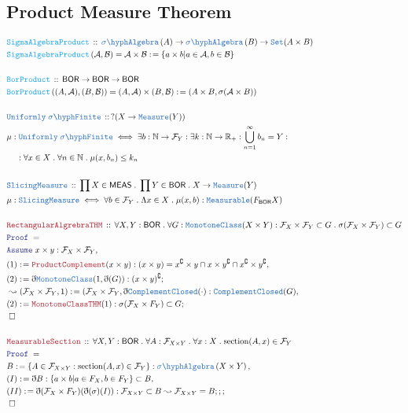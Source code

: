 \documentclass[12pt]{scrartcl}
\newcommand{\TYPE}[1]{\textcolor{NavyBlue}{\mathtt{#1}}}
\newcommand{\FUNC}[1]{\textcolor{Cerulean}{\mathtt{#1}}}
\newcommand{\LOGIC}[1]{\textcolor{Blue}{\mathtt{#1}}}
\newcommand{\THM}[1]{\textcolor{Maroon}{\mathtt{#1}}}
\renewcommand{\.}{\; . \;}
\newcommand{\de}{: \kern 0.1pc =}
\newcommand{\Act}[1]{\left( #1 \right)}
\newcommand{\Theorem}[2]{& \THM{#1} \, :: \, #2 \\ & \Proof = \\ }
\newcommand{\DeclareType}[2]{& \TYPE{#1} \, :: \, #2 \\}
\newcommand{\DefineType}[3]{& #1 : \TYPE{#2} \iff #3 \\}
\newcommand{\DeclareFunc}[2]{& \FUNC{#1} \, :: \, #2 \\}
\newcommand{\DefineNamedFunc}[4]{&  \FUNC{#1}\Act{#2} = #3 \de #4 \\}
\newcommand{\NewLine}{\\ & \kern 1pc}
\newcommand{\ForEach}[3]{\forall #1 : #2 \. #3 }
\newcommand{\Reals}{\mathbb{R} }
\newcommand{\Nat}{\mathbb{N} }
\newcommand{\Set}{\TYPE{Set}}
\renewcommand{\c}{\complement}
\newcommand{\Say}[3]{& #1 \de #2 : #3, \\}
\newcommand{\Conclude}[3]{& #1 \de #2 : #3; \\}
\newcommand{\Derive}[3]{& \leadsto #1 \de #2 : #3, \\}
\newcommand{\A}{\LOGIC{Assume} \;}
\newcommand{\Assume}[2]{& \A #1 : #2, \\}
\newcommand{\QED}{\; \square}
\newcommand{\EndProof}{& \QED \\}
\newcommand{\ByDef}{\eth}
\newcommand{\Proof}{\LOGIC{Proof} \; }
\newcommand{\SA}[1]{\TYPE{\sigma \hyph  Algebra}\left( #1 \right) }
\newcommand{\BOR}{\mathsf{BOR}}
\newcommand{\F}{\mathcal{F}}
\newcommand{\B}{\mathcal{B}}
\begin{document}
\subsection{Product Measure Theorem }
\begin{align*}
\DeclareFunc{SigmaAlgebraProduct}{\SA{A} \to \SA{B} \to \Set(A \times B)}
\DefineNamedFunc{SigmaAlgebraProduct}{\mathcal{A},\B}{\mathcal{A} \times \B}
{\{ a \times b | a \in \mathcal{A}, b \in \mathcal{B} \}}
\\
\DeclareFunc{BorProduct}{\mathsf{BOR} \to \mathsf{BOR} \to \mathsf{BOR}}
\DefineNamedFunc{BorProduct}{(A,\mathcal{A}),(B,\B)}{(A,\mathcal{A}) \times (B,\B)}
{(A \times B, \sigma(\mathcal{A} \times B))}
\\
\DeclareType{Uniformly \; \sigma \hyph Finite}{ ?(
X \to \TYPE{Measure}(Y) ) }
\DefineType{\mu}{Uniformly \; \sigma \hyph Finite}
{ \exists b : \Nat \to \F_Y : \exists k : \Nat \to \Reals_+ : \bigcup^\infty_{n = 1} b_n = 
Y : \NewLine
 :
\forall x \in X \. \forall n \in \Nat \. \mu(x,b_n) \le k_n }
\\
\DeclareType{SlicingMeasure}{\prod X \in \mathsf{MEAS} \. 
\prod Y \in \BOR \.
X \to \TYPE{Measure}(Y) }
\DefineType{\mu}{SlicingMeasure}
 {\forall b \in \F_Y \. \Lambda x \in X \. \mu(x,b) : \TYPE{Measurable}(F_{\BOR}X)}
 \\
 \Theorem{RectangularAlgrebraTHM}{
 \ForEach{ X, Y}{ \BOR }{ 
 \ForEach{ G}{ \TYPE{MonotoneClass}(X \times Y) : \F_X \times \F_Y \subset G}{  \sigma(\F_X \times \F_Y) \subset G} 
 }}
 \Assume{x \times y}{\F_X \times \F_Y }
 \Say{(1)}{\THM{ProductComplement}(x \times y)}{ (x \times y) = x^\c \times y \cap x \times y^\c \cap x^\c \times y^\c }
 \Conclude{(2)}{\ByDef\TYPE{MonotoneClass}(1,\ByDef(G))}{ (x \times y)^\c }
 \Derive{(\F_X \times \F_Y, 1)}{(\F_X \times \F_Y,\ByDef \TYPE{ComplementClosed}(\cdot)}{\TYPE{ComplementClosed}(G)}
 \Conclude{ (2) }{\THM{MonotoneClassTHM}(1)}{\sigma(\F_X \times F_Y) \subset G}
 \EndProof
 \\ 
 \Theorem{MeasurableSection}{
 \ForEach{ X,Y}{\BOR}{ 
 \ForEach{A}{\F_{X \times Y  }}{ 
 \ForEach{x}{X}{  \mathrm{section}(A,x) \in \F_Y}  
 }}}
 \Say{B}{\{ A \in \F_{X \times Y} : \mathrm{section}(A,x) \in \F_Y \}}{\SA{X \times Y}}
 \Say{(I)}{\ByDef{B}}{ \{ a \times b | a \in F_X , b \in F_Y \}
   \subset  B}
 \Conclude{(II)}{\ByDef(\F_X \times F_Y)(\ByDef(\sigma)(I))}{\F_{X \times Y} \subset B  \leadsto
  \F_{X \times Y} = B ;; 
 }
 \EndProof
 \end{align*}
 \newpage
\end{document}
